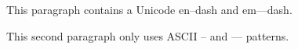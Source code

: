 This paragraph contains a Unicode en–dash and em—dash.

This second paragraph only uses ASCII -- and --- patterns.


